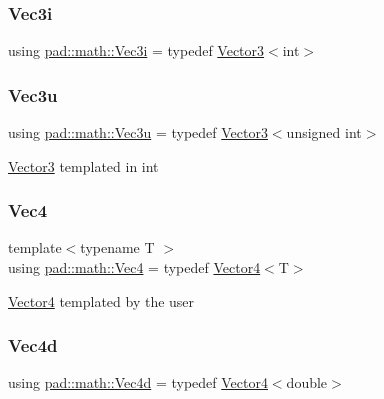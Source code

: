 \subsubsection{\texorpdfstring{Vec3i}{Vec3i}}
{\footnotesize\ttfamily using \mbox{\hyperlink{namespacepad_1_1math_acccfc4afcdb1f72c6881e0e74078eb7b}{pad\+::math\+::\+Vec3i}} = typedef \mbox{\hyperlink{structpad_1_1math_1_1_vector3}{Vector3}}$<$int$>$}

\mbox{\label{namespacepad_1_1math_ad75d374d51ed67887ddde9d2111e69fd}} 
\subsubsection{\texorpdfstring{Vec3u}{Vec3u}}
{\footnotesize\ttfamily using \mbox{\hyperlink{namespacepad_1_1math_ad75d374d51ed67887ddde9d2111e69fd}{pad\+::math\+::\+Vec3u}} = typedef \mbox{\hyperlink{structpad_1_1math_1_1_vector3}{Vector3}}$<$unsigned int$>$}

\mbox{\hyperlink{structpad_1_1math_1_1_vector3}{Vector3}} templated in int \mbox{\label{namespacepad_1_1math_a97a1193114b33cea7a82ae656d507825}} 
\subsubsection{\texorpdfstring{Vec4}{Vec4}}
{\footnotesize\ttfamily template$<$typename T $>$ \\
using \mbox{\hyperlink{namespacepad_1_1math_a97a1193114b33cea7a82ae656d507825}{pad\+::math\+::\+Vec4}} = typedef \mbox{\hyperlink{structpad_1_1math_1_1_vector4}{Vector4}}$<$T$>$}

\mbox{\hyperlink{structpad_1_1math_1_1_vector4}{Vector4}} templated by the user \mbox{\label{namespacepad_1_1math_a845efb6de5d2237d1a7f27cf87741454}} 
\subsubsection{\texorpdfstring{Vec4d}{Vec4d}}
{\footnotesize\ttfamily using \mbox{\hyperlink{namespacepad_1_1math_a845efb6de5d2237d1a7f27cf87741454}{pad\+::math\+::\+Vec4d}} = typedef \mbox{\hyperlink{structpad_1_1math_1_1_vector4}{Vector4}}$<$double$>$}

